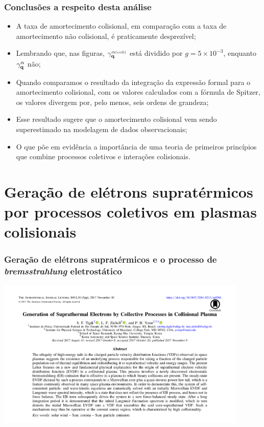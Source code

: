 \documentclass[10pt,aspectratio=1610,lualatex]{beamer}
\begin{document}
\begin{frame}
  \frametitle{Conclusões a respeito desta análise}
  \begin{itemize}
    \item A taxa de amortecimento colisional, em comparação com
    a taxa de amortecimento não colisional, é praticamente desprezível;
    \vspace{0.4cm}
    \pause
    \item Lembrando que, nas figuras, $\gamma_{\bf q}^{\alpha \mbox{\tiny(coll)}}$
    está dividido por  $g=5\times 10^{-3}$, enquanto $\gamma_{\bf q}^\alpha$ não;
    \vspace{0.4cm}
    \pause
    \item Quando comparamos o resultado da integração da expressão formal
    para o amortecimento colisional, com os valores calculados com a
    fórmula de Spitzer, os valores divergem por, pelo menos, seis ordens
    de grandeza;
    \vspace{0.4cm}
    \pause
    \item Esse resultado sugere que o amortecimento colisional
    vem sendo superestimado na modelagem de dados observacionais;
    \vspace{0.4cm}
    \pause
    \item O que põe em evidência a importância de uma teoria de primeiros
    princípios que combine processos coletivos e interações colisionais.
  \end{itemize}
\end{frame}

\section*{Geração de elétrons supratérmicos por processos
  coletivos em plasmas colisionais}
\begin{frame}
  \frametitle{Geração de elétrons supratérmicos e o processo de
    \emph{bremsstrahlung} eletrostático}
 \centering \includegraphics[width=0.9\textwidth]{print_Tigik2017a.png}
\end{frame}
\end{document}

